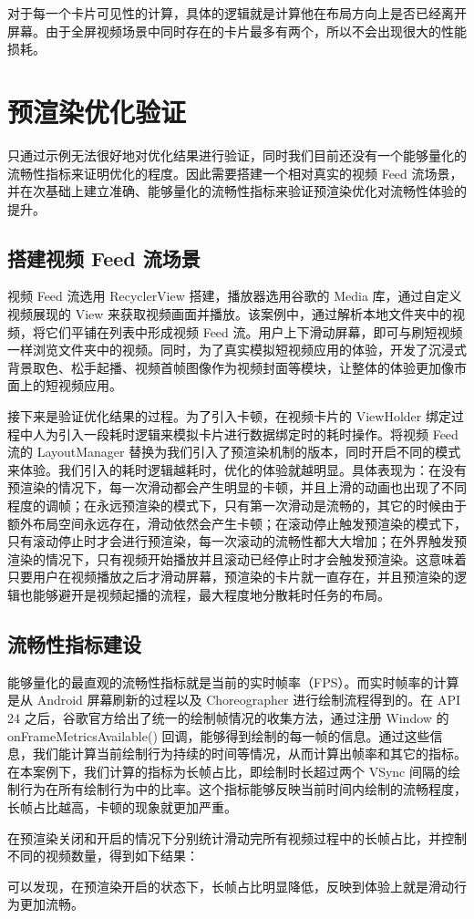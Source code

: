 对于每一个卡片可见性的计算，具体的逻辑就是计算他在布局方向上是否已经离开屏幕。由于全屏视频场景中同时存在的卡片最多有两个，所以不会出现很大的性能损耗。

\section{预渲染优化验证}

只通过示例无法很好地对优化结果进行验证，同时我们目前还没有一个能够量化的流畅性指标来证明优化的程度。因此需要搭建一个相对真实的视频 Feed 流场景，并在次基础上建立准确、能够量化的流畅性指标来验证预渲染优化对流畅性体验的提升。

\subsection{搭建视频 Feed 流场景}

视频 Feed 流选用 RecyclerView 搭建，播放器选用谷歌的 Media 库，通过自定义视频展现的 View 来获取视频画面并播放。该案例中，通过解析本地文件夹中的视频，将它们平铺在列表中形成视频 Feed 流。用户上下滑动屏幕，即可与刷短视频一样浏览文件夹中的视频。同时，为了真实模拟短视频应用的体验，开发了沉浸式背景取色、松手起播、视频首帧图像作为视频封面等模块，让整体的体验更加像市面上的短视频应用。

接下来是验证优化结果的过程。为了引入卡顿，在视频卡片的 ViewHolder 绑定过程中人为引入一段耗时逻辑来模拟卡片进行数据绑定时的耗时操作。将视频 Feed 流的 LayoutManager 替换为我们引入了预渲染机制的版本，同时开启不同的模式来体验。我们引入的耗时逻辑越耗时，优化的体验就越明显。具体表现为：在没有预渲染的情况下，每一次滑动都会产生明显的卡顿，并且上滑的动画也出现了不同程度的调帧；在永远预渲染的模式下，只有第一次滑动是流畅的，其它的时候由于额外布局空间永远存在，滑动依然会产生卡顿；在滚动停止触发预渲染的模式下，只有滚动停止时才会进行预渲染，每一次滚动的流畅性都大大增加；在外界触发预渲染的情况下，只有视频开始播放并且滚动已经停止时才会触发预渲染。这意味着只要用户在视频播放之后才滑动屏幕，预渲染的卡片就一直存在，并且预渲染的逻辑也能够避开是视频起播的流程，最大程度地分散耗时任务的布局。

\subsection{流畅性指标建设}

能够量化的最直观的流畅性指标就是当前的实时帧率（FPS）。而实时帧率的计算是从 Android 屏幕刷新的过程以及 Choreographer 进行绘制流程得到的。在 API 24 之后，谷歌官方给出了统一的绘制帧情况的收集方法，通过注册 Window 的 onFrameMetricsAvailable() 回调，能够得到绘制的每一帧的信息。通过这些信息，我们能计算当前绘制行为持续的时间等情况，从而计算出帧率和其它的指标。在本案例下，我们计算的指标为长帧占比，即绘制时长超过两个 VSync 间隔的绘制行为在所有绘制行为中的比率。这个指标能够反映当前时间内绘制的流畅程度，长帧占比越高，卡顿的现象就更加严重。

在预渲染关闭和开启的情况下分别统计滑动完所有视频过程中的长帧占比，并控制不同的视频数量，得到如下结果：

可以发现，在预渲染开启的状态下，长帧占比明显降低，反映到体验上就是滑动行为更加流畅。